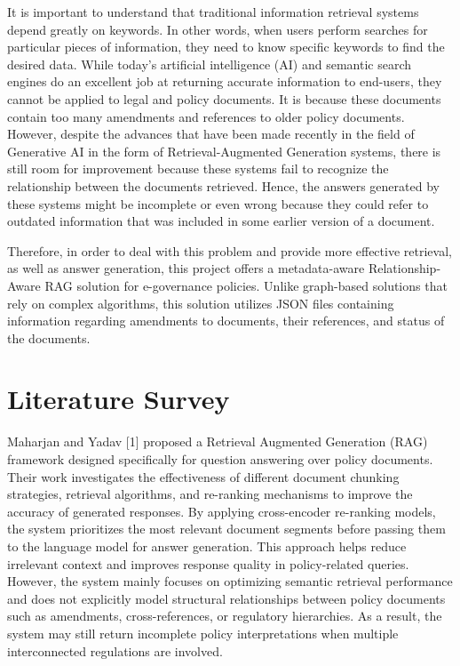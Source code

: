 \documentclass[conference]{IEEEtran}
\begin{document}
It is important to understand that traditional information retrieval systems depend greatly on keywords. In other words, when users perform searches for particular pieces of information, they need to know specific keywords to find the desired data. While today's artificial intelligence (AI) and semantic search engines do an excellent job at returning accurate information to end-users, they cannot be applied to legal and policy documents. It is because these documents contain too many amendments and references to older policy documents. However, despite the advances that have been made recently in the field of Generative AI in the form of Retrieval-Augmented Generation systems, there is still room for improvement because these systems fail to recognize the relationship between the documents retrieved. Hence, the answers generated by these systems might be incomplete or even wrong because they could refer to outdated information that was included in some earlier version of a document.

Therefore, in order to deal with this problem and provide more effective retrieval, as well as answer generation, this project offers a metadata-aware Relationship-Aware RAG solution for e-governance policies. Unlike graph-based solutions that rely on complex algorithms, this solution utilizes JSON files containing information regarding amendments to documents, their references, and status of the documents.

\section{Literature Survey}
Maharjan and Yadav [1] proposed a Retrieval Augmented Generation (RAG) framework designed specifically for question answering over policy documents. Their work investigates the effectiveness of different document chunking strategies, retrieval algorithms, and re-ranking mechanisms to improve the accuracy of generated responses. By applying cross-encoder re-ranking models, the system prioritizes the most relevant document segments before passing them to the language model for answer generation. This approach helps reduce irrelevant context and improves response quality in policy-related queries. However, the system mainly focuses on optimizing semantic retrieval performance and does not explicitly model structural relationships between policy documents such as amendments, cross-references, or regulatory hierarchies. As a result, the system may still return incomplete policy interpretations when multiple interconnected regulations are involved.
\end{document}
